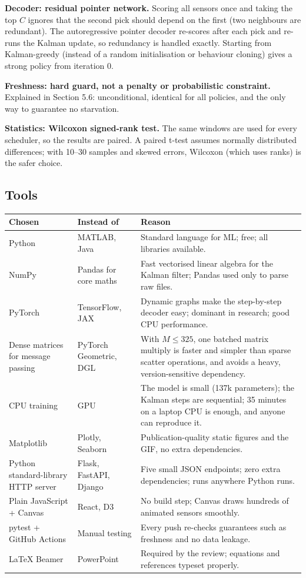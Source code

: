 \textbf{Decoder: residual pointer network.} Scoring all sensors once and taking the top $C$ ignores that the second pick
should depend on the first (two neighbours are redundant). The autoregressive pointer decoder \cite{22} re-scores after
each pick and re-runs the Kalman update, so redundancy is handled exactly. Starting from Kalman-greedy (instead of a
random initialisation or behaviour cloning) gives a strong policy from iteration 0.

\textbf{Freshness: hard guard, not a penalty or probabilistic constraint.} Explained in Section 5.6: unconditional,
identical for all policies, and the only way to guarantee no starvation.

\textbf{Statistics: Wilcoxon signed-rank test.} The same windows are used for every scheduler, so the results are
paired. A paired t-test assumes normally distributed differences; with 10--30 samples and skewed errors, Wilcoxon (which
uses ranks) is the safer choice.

\subsection{Tools}

\begin{center}
\small
\begin{tabularx}{\textwidth}{@{}p{3.3cm}p{3.3cm}X@{}}
\toprule
\textbf{Chosen} & \textbf{Instead of} & \textbf{Reason} \\
\midrule
Python & MATLAB, Java & Standard language for ML; free; all libraries available. \\
NumPy & Pandas for core maths & Fast vectorised linear algebra for the Kalman filter; Pandas used only to parse raw files. \\
PyTorch & TensorFlow, JAX & Dynamic graphs make the step-by-step decoder easy; dominant in research; good CPU performance. \\
Dense matrices for message passing & PyTorch Geometric, DGL & With $M\le325$, one batched matrix multiply is faster and simpler than sparse scatter operations, and avoids a heavy, version-sensitive dependency. \\
CPU training & GPU & The model is small (137k parameters); the Kalman steps are sequential; 35 minutes on a laptop CPU is enough, and anyone can reproduce it. \\
Matplotlib & Plotly, Seaborn & Publication-quality static figures and the GIF, no extra dependencies. \\
Python standard-library HTTP server & Flask, FastAPI, Django & Five small JSON endpoints; zero extra dependencies; runs anywhere Python runs. \\
Plain JavaScript + Canvas & React, D3 & No build step; Canvas draws hundreds of animated sensors smoothly. \\
pytest + GitHub Actions & Manual testing & Every push re-checks guarantees such as freshness and no data leakage. \\
LaTeX Beamer & PowerPoint & Required by the review; equations and references typeset properly. \\
\bottomrule
\end{tabularx}
\end{center}

